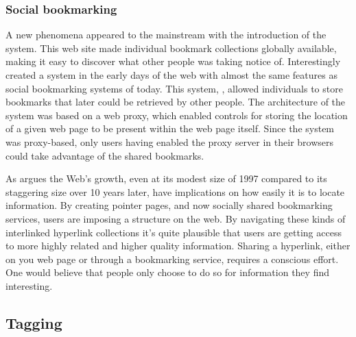 
\subsubsection{Social bookmarking}

A new phenomena appeared to the mainstream with the introduction of the
 system. This web site made individual
bookmark collections globally available, making it easy to discover what other
people was taking notice of. Interestingly \citet{keller97} created a system
in the early days of the web with almost the same features as social
bookmarking systems of today. This system, , allowed
individuals to store bookmarks that later could be retrieved by other people.
The architecture of the system was based on a web proxy, which enabled
controls for storing the location of a given web page to be present within the
web page itself. Since the system was proxy-based, only users having enabled
the proxy server in their browsers could take advantage of the shared
bookmarks.

As \citet[]{dieberger97} argues the Web's growth, even at its modest
size of 1997 compared to its staggering size over 10 years later, have
implications on how easily it is to locate information. By creating pointer
pages, and now socially shared bookmarking services, users are imposing a
structure on the web. By navigating these kinds of interlinked hyperlink
collections it's quite plausible that users are getting access to more highly
related and higher quality information. Sharing a hyperlink, either on you web
page or through a bookmarking service, requires a conscious effort. One would
believe that people only choose to do so for information they find
interesting.

\subsection{Tagging}

